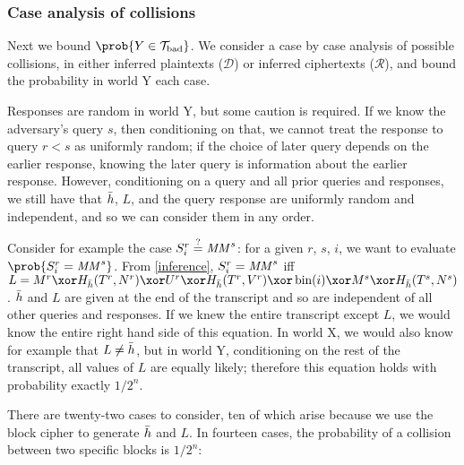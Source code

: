 \documentclass[hctr2.tex]{subfiles}
\begin{document}
\subsubsection{Case analysis of collisions}
Next we bound \(\prob{Y \in \Tb}\).
We consider a case by case analysis of possible collisions,
in either inferred plaintexts (\(\mathcal{D}\))
or inferred ciphertexts (\(\mathcal{R}\)),
and bound the probability in world Y each case.

Responses are random in world Y,
but some caution is required.
If we know the adversary's query \(s\), then conditioning on that,
we cannot treat the response to query \(r < s\) as uniformly random;
if the choice of later query depends on the earlier response,
knowing the later query is information about the earlier response.
However, conditioning on a query and all prior queries and responses,
we still have that \(\bar{h}\), \(L\), and the
query response are uniformly random and independent,
and so we can consider them in any order.

Consider for example the case \(S_i^r \stackrel{\text{?}}{=} \mathit{MM}^s\):
for a given \(r\), \(s\), \(i\),
we want to evaluate \(\prob{S_i^r = \MM^s}\).
From \autoref{inference}, \(S_i^r = \mathit{MM}^s\)
iff \(L = M^r \xor H_{\hgen}(T^r, N^r) \xor U^r \xor H_{\hgen}(T^r, V^r)
\xor \fromint(i) \xor M^s \xor H_{\hgen}(T^s, N^s)\).
\(\bar{h}\) and \(L\) are given at the end of the transcript
and so are independent of all other queries and responses.
If we knew the entire transcript except \(L\),
we would know the entire right hand side of this equation.
In world X, we would also know for example that \(L \neq \bar{h}\), but
in world Y, conditioning on the rest of the transcript,
all values of \(L\) are equally likely;
therefore this equation holds with probability exactly \(1/2^n\).

There are twenty-two cases to consider,
ten of which arise because we use the block cipher
to generate \(\bar{h}\) and \(L\).
In fourteen cases, the probability of a collision
between two specific blocks is \(1/2^n\):
\end{document}
